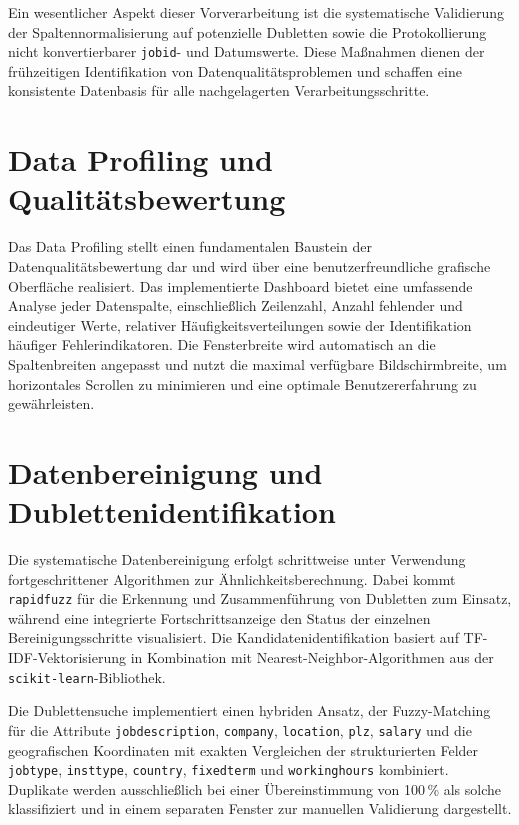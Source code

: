 \documentclass[
    a4paper,
    12pt,
    headinclude=true,
    BCOR=10mm,
]{scrreprt}
\begin{document}
Ein wesentlicher Aspekt dieser Vorverarbeitung ist die systematische Validierung der Spaltennormalisierung auf potenzielle Dubletten sowie die Protokollierung nicht konvertierbarer \texttt{jobid}- und Datumswerte. Diese Maßnahmen dienen der frühzeitigen Identifikation von Datenqualitätsproblemen und schaffen eine konsistente Datenbasis für alle nachgelagerten Verarbeitungsschritte.

\section{Data Profiling und Qualitätsbewertung}

Das Data Profiling stellt einen fundamentalen Baustein der Datenqualitätsbewertung dar und wird über eine benutzerfreundliche grafische Oberfläche realisiert. Das implementierte Dashboard bietet eine umfassende Analyse jeder Datenspalte, einschließlich Zeilenzahl, Anzahl fehlender und eindeutiger Werte, relativer Häufigkeitsverteilungen sowie der Identifikation häufiger Fehlerindikatoren. Die Fensterbreite wird automatisch an die Spaltenbreiten angepasst und nutzt die maximal verfügbare Bildschirmbreite, um horizontales Scrollen zu minimieren und eine optimale Benutzererfahrung zu gewährleisten.

\section{Datenbereinigung und Dublettenidentifikation}

Die systematische Datenbereinigung erfolgt schrittweise unter Verwendung fortgeschrittener Algorithmen zur Ähnlichkeitsberechnung. Dabei kommt \texttt{rapidfuzz} für die Erkennung und Zusammenführung von Dubletten zum Einsatz, während eine integrierte Fortschrittsanzeige den Status der einzelnen Bereinigungsschritte visualisiert. Die Kandidatenidentifikation basiert auf TF-IDF-Vektorisierung in Kombination mit Nearest-Neighbor-Algorithmen aus der \texttt{scikit-learn}-Bibliothek.

Die Dublettensuche implementiert einen hybriden Ansatz, der Fuzzy-Matching für die Attribute \texttt{jobdescription}, \texttt{company}, \texttt{location}, \texttt{plz}, \texttt{salary} und die geografischen Koordinaten mit exakten Vergleichen der strukturierten Felder \texttt{jobtype}, \texttt{insttype}, \texttt{country}, \texttt{fixedterm} und \texttt{workinghours} kombiniert. Duplikate werden ausschließlich bei einer Übereinstimmung von 100\,\% als solche klassifiziert und in einem separaten Fenster zur manuellen Validierung dargestellt.
\end{document}
